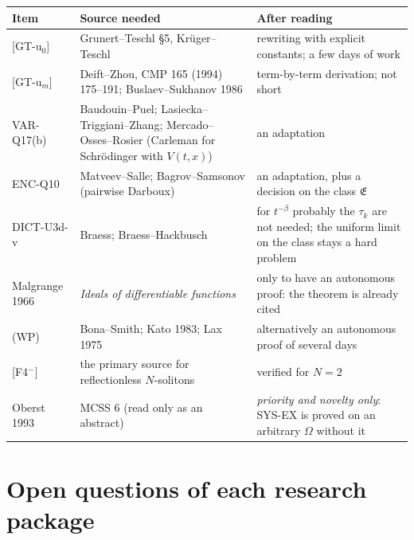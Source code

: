 \begin{center}\small
\begin{longtable}{@{}L{2.4cm}L{5.4cm}L{7.0cm}@{}}
\toprule
Item & Source needed & After reading\\\midrule\endhead
{[GT-u$_0$]} & Grunert--Teschl \S5, Kr\"uger--Teschl & rewriting with explicit constants; a few days of work\\
{[GT-u$_m$]} & Deift--Zhou, CMP 165 (1994) 175--191; Buslaev--Sukhanov 1986 & term-by-term derivation; not short\\
VAR-Q17(b) & Baudouin--Puel; Lasiecka--Triggiani--Zhang; Mercado--Osses--Rosier (Carleman for Schr\"odinger with $V(t,x)$) & an adaptation\\
ENC-Q10 & Matveev--Salle; Bagrov--Samsonov (pairwise Darboux) & an adaptation, plus a decision on the class $\mathfrak E$\\
DICT-U3d-v & Braess; Braess--Hackbusch & for $t^{-\beta}$ probably the $\tau_k$ are not needed; the uniform limit on the class stays a hard problem\\
Malgrange 1966 & \emph{Ideals of differentiable functions} & only to have an autonomous proof: the theorem is already cited\\
(WP) & Bona--Smith; Kato 1983; Lax 1975 & alternatively an autonomous proof of several days\\
{[F4$^-$]} & the primary source for reflectionless $N$-solitons & verified for $N=2$\\
Oberst 1993 & MCSS 6 (read only as an abstract) & \emph{priority and novelty only}: SYS-EX is proved on an arbitrary $\Omega$ without it\\
\bottomrule
\end{longtable}
\end{center}

\section{Open questions of each research package}

